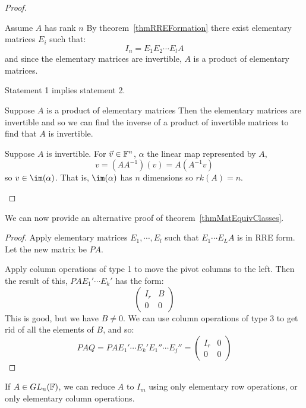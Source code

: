 \documentclass[../Main.tex]{subfiles}
\begin{document}
\begin{proof}
    \begin{subproof}{Assume $A$ has rank $n$}
        By theorem~\ref{thmRREFormation} there exist elementary matrices $E_i$ such that:
        \begin{equation*}
            I_n = E_1 E_2 \cdots E_l A
        \end{equation*}
        and since the elementary matrices are invertible, $A$ is a product of elementary matrices.

        Statement 1 implies statement 2.
    \end{subproof}
    \begin{subproof}{Suppose $A$ is a product of elementary matrices}
        Then the elementary matrices are invertible and so we can find the inverse of a product of invertible matrices to find that $A$ is invertible.
    \end{subproof}
    \begin{subproof}{Suppose $A$ is invertible.}
        For $\vec{v} \in \mathbb{F}^n$, $\alpha$ the linear map represented by $A$,
        \begin{equation*}
            v = (AA^{-1})(v) = A(A^{-1}v)
        \end{equation*}
        so $v \in \im(\alpha)$. That is, $\im(\alpha)$ has $n$ dimensions so $rk(A) = n$.
    \end{subproof}
\end{proof}
We can now provide an alternative proof of theorem~\ref{thmMatEquivClasses}.
\begin{proof}
    Apply elementary matrices $E_1, \cdots, E_l$ such that $E_1 \cdots E_L A$ is in RRE form. Let the new matrix be $PA$.

    Apply column operations of type 1 to move the pivot columns to the left. Then the result of this, $PAE_1' \cdots E_k'$ has the form:
    \begin{equation*}
        \begin{pmatrix}
            I_r & B \\
            0 & 0
        \end{pmatrix}
    \end{equation*}
    This is good, but we have $B \neq 0$. We can use column operations of type 3 to get rid of all the elements of $B$, and so:
    \begin{equation*}
        PAQ = PAE_1' \cdots E_k' E_1'' \cdots E_j'' =
        \begin{pmatrix}
            I_r & 0 \\
            0 & 0
        \end{pmatrix}
    \end{equation*}
\end{proof}
\begin{remark}
    If $A \in GL_n(\mathbb{F})$, we can reduce $A$ to $I_m$ using only elementary row operations, or only elementary column operations.
\end{remark}
\end{document}
